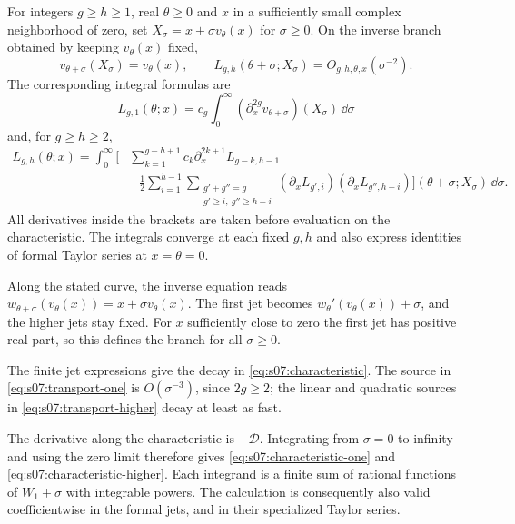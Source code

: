 \begin{crl}\label{crl:s07:characteristic-recovery}
For integers $g\geq h\geq1$, real $\theta\geq0$ and $x$ in a sufficiently small complex
neighborhood of zero, set
$X_\sigma=x+\sigma v_\theta(x)$ for $\sigma\geq0$.
On the inverse branch obtained by keeping $v_\theta(x)$ fixed,
\begin{equation}\label{eq:s07:characteristic}
 v_{\theta+\sigma}(X_\sigma)=v_\theta(x),\qquad
 L_{g,h}(\theta+\sigma;X_\sigma)=O_{g,h,\theta,x}(\sigma^{-2}).
\end{equation}
The corresponding integral formulas are
\begin{equation}\label{eq:s07:characteristic-one}
 L_{g,1}(\theta;x)
 =c_g\int_0^\infty
       (\partial_x^{2g}v_{\theta+\sigma})(X_\sigma)\,\dd\sigma
\end{equation}
and, for $g\geq h\geq2$,
\begin{equation}\label{eq:s07:characteristic-higher}
 \begin{aligned}
 L_{g,h}(\theta;x)=\int_0^\infty
 \Biggl[&\sum_{k=1}^{g-h+1}c_k\partial_x^{2k+1}L_{g-k,h-1}\\
 &+\frac12\sum_{i=1}^{h-1}
   \sum_{\substack{g'+g''=g\\g'\geq i,\ g''\geq h-i}}
     (\partial_xL_{g',i})(\partial_xL_{g'',h-i})
 \Biggr](\theta+\sigma;X_\sigma)\,\dd\sigma.
 \end{aligned}
\end{equation}
All derivatives inside the brackets are taken before evaluation on
the characteristic. The integrals converge at each fixed $g,h$ and
also express identities of formal Taylor series at $x=\theta=0$.
\end{crl}
\begin{prf}
Along the stated curve, the inverse equation reads
$w_{\theta+\sigma}(v_\theta(x))=x+\sigma v_\theta(x)$.
The first jet becomes $w_\theta'(v_\theta(x))+\sigma$, and the
higher jets stay fixed. For $x$ sufficiently close to zero the
first jet has positive real part, so this defines the branch for
all $\sigma\geq0$.

The finite jet expressions give the decay in
\eqref{eq:s07:characteristic}. The source in
\eqref{eq:s07:transport-one} is $O(\sigma^{-3})$, since
$2g\geq2$; the linear and quadratic sources in
\eqref{eq:s07:transport-higher} decay at least as fast.

The derivative along the characteristic is $-\mathscr D$.
Integrating from $\sigma=0$ to infinity and using the zero limit
therefore gives \eqref{eq:s07:characteristic-one} and
\eqref{eq:s07:characteristic-higher}. Each integrand is a finite
sum of rational functions of $W_1+\sigma$ with integrable powers.
The calculation is consequently also valid coefficientwise in the
formal jets, and in their specialized Taylor series.
\end{prf}

